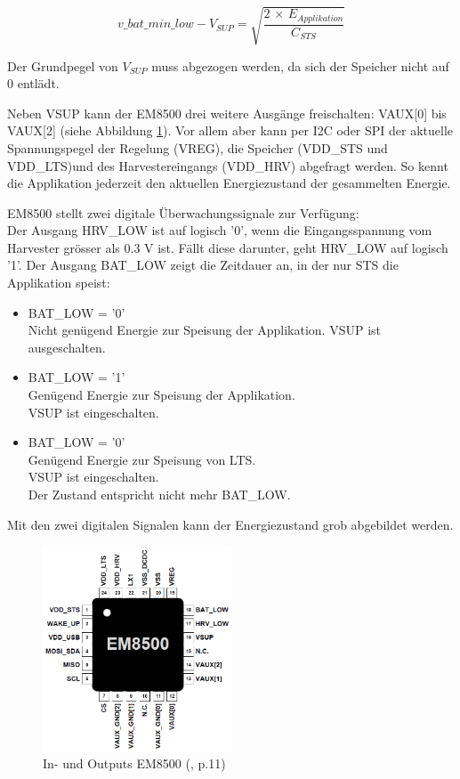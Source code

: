 \begin{equation}
v\_bat\_min\_low - V_{SUP} = \sqrt{\frac{2\, \times \, E_{Applikation}}{C_{STS}}}
\end{equation}

Der Grundpegel von $V_{SUP}$ muss abgezogen werden, da sich der Speicher nicht auf 0 entlädt.

Neben VSUP kann der EM8500 drei weitere Ausgänge freischalten: VAUX[0] bis VAUX[2] (siehe Abbildung  \ref{IOEM8500}). Vor allem aber kann per I2C oder SPI der aktuelle Spannungspegel der Regelung (VREG), die Speicher (VDD\_STS und VDD\_LTS)und des Harvestereingangs (VDD\_HRV) abgefragt werden. So kennt die Applikation jederzeit den aktuellen Energiezustand der gesammelten Energie.

EM8500 stellt zwei digitale Überwachungssignale zur Verfügung:\\ 
Der Ausgang HRV\_LOW ist auf logisch '0', wenn die Eingangsspannung vom Harvester grösser als 0.3 V ist. Fällt diese darunter, geht HRV\_LOW auf logisch '1'.
Der Ausgang BAT\_LOW zeigt die Zeitdauer an, in der nur STS die Applikation speist:

\begin{itemize}
     \item BAT\_LOW = '0'\\
           Nicht genügend Energie zur Speisung der Applikation.
           VSUP ist ausgeschalten.
     \item BAT\_LOW = '1'\\
           Genügend Energie zur Speisung der Applikation.\\
           VSUP ist eingeschalten.
      \item BAT\_LOW = '0'\\
           Genügend Energie zur Speisung von LTS.\\
           VSUP ist eingeschalten.\\
           Der Zustand entspricht nicht mehr BAT\_LOW.   
\end{itemize} 

Mit den zwei digitalen Signalen kann der Energiezustand grob abgebildet werden.

\begin{figure}[ht]
    \includegraphics[width=0.5\textwidth]{2TheoretischeGrundlagen/imag/EM8500IO.png}
    \caption{In- und Outputs EM8500  (\cite{datasheet_EM85}, p.11)}
    \label{IOEM8500} 
\end{figure}



